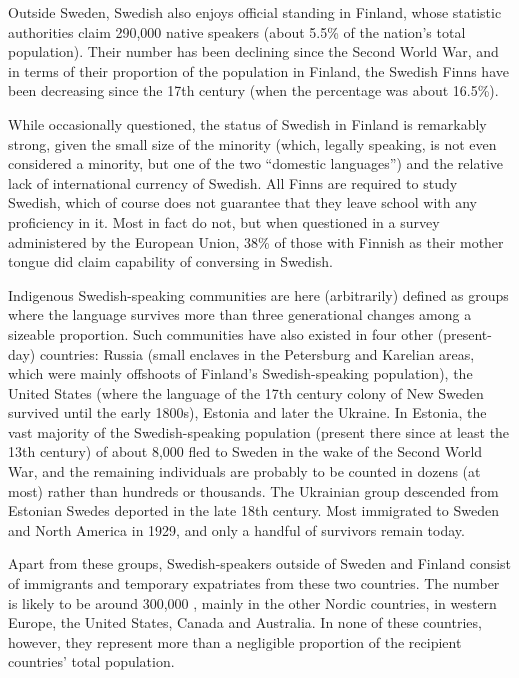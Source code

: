 \begin{multicols}{2}
Outside Sweden, Swedish also enjoys official standing in Finland,
whose statistic authorities claim 290,000 native speakers (about 5.5\%
of the nation’s total population). Their number has been declining
since the Second World War, and in terms of their proportion of the
population in Finland, the Swedish Finns have been decreasing since
the 17th century (when the percentage was about 16.5\%).

While occasionally questioned, the status of Swedish in Finland is
remarkably strong, given the small size of the minority (which,
legally speaking, is not even considered a minority, but one of the
two ``domestic languages'') and the relative lack of international
currency of Swedish. All Finns are required to study Swedish, which of
course does not guarantee that they leave school with any proficiency
in it. Most in fact do not, but when questioned in a survey
administered by the European Union,\cite{EC243} 38\%
of those with Finnish as their mother tongue did claim capability of
conversing in Swedish.


Indigenous Swedish-speaking communities are here (arbitrarily) defined as
groups where the language survives more than three generational
changes among a sizeable proportion. Such communities have also
existed in four other (present-day) countries: Russia (small enclaves
in the Petersburg and Karelian areas, which were mainly offshoots of
Finland’s Swedish-speaking population), the United States (where the
language of the 17th century colony of New Sweden survived until the
early 1800s), Estonia and later the Ukraine. In Estonia, the vast
majority of the Swedish-speaking population (present there since at
least the 13th century) of about 8,000 fled to Sweden in the wake of
the Second World War, and the remaining individuals are probably to be
counted in dozens (at most) rather than hundreds or thousands. The
Ukrainian group descended from Estonian Swedes deported in the late
18th century. Most immigrated to Sweden and North America in 1929, and
only a handful of survivors remain today.

Apart from these groups, Swedish-speakers outside of Sweden and
Finland consist of immigrants and temporary expatriates from these two
countries. The number is likely to be around 300,000
\cite{parkvall2010}, mainly in the other Nordic countries, in western
Europe, the United States, Canada and Australia. In none of these
countries, however, they represent more than a negligible
proportion of the recipient countries' total population.


\end{multicols}
